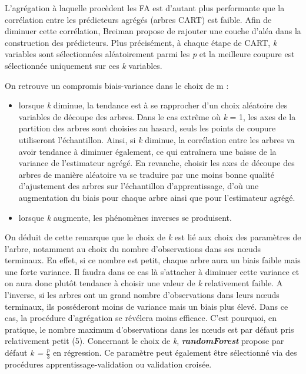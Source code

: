 	L'agrégation à laquelle procèdent les FA est d’autant plus performante que la corrélation entre les prédicteurs agrégés  (arbres CART) est faible. Afin de diminuer cette corrélation, Breiman\cite{BREI01} propose de rajouter une couche d’aléa dans la construction des
		prédicteurs. Plus précisément, à chaque étape de CART, \textit{k} variables sont sélectionnées aléatoirement parmi les \textit{p} et la meilleure coupure est sélectionnée uniquement sur ces \textit{k} variables. \par
		On retrouve un compromis biais-variance dans le choix de m :
		\begin{itemize}
		\item lorsque \textit{k} diminue, la tendance est à se rapprocher d’un choix aléatoire des variables
		de découpe des arbres. Dans le cas extrême où \textit{k} = 1, les axes de la partition des arbres
		sont choisies au hasard, seuls les points de coupure utiliseront l’échantillon. Ainsi, si \textit{k}
		diminue, la corrélation entre les arbres va avoir tendance à diminuer également, ce qui
		entraînera une baisse de la variance de l’estimateur agrégé. En revanche, choisir les axes
		de découpe des arbres de manière aléatoire va se traduire par une moins bonne
		qualité d’ajustement des arbres sur l’échantillon d’apprentissage, d’où une augmentation
		du biais pour chaque arbre ainsi que pour l’estimateur agrégé.
		\item lorsque \textit{k} augmente, les phénomènes inverses se produisent.
		\end{itemize}
		On déduit de cette remarque que le choix de \textit{k} est lié aux choix des paramètres de l’arbre,
		notamment au choix du nombre d’observations dans ses nœuds terminaux. En effet, si ce
		nombre est petit, chaque arbre aura un biais faible mais une forte variance. Il faudra dans ce cas là s’attacher à diminuer cette variance et on aura donc plutôt tendance à choisir une
		valeur de \textit{k} relativement faible. A l’inverse, si les arbres ont un grand nombre d’observations
		dans leurs nœuds terminaux, ils posséderont moins de variance mais un biais plus élevé. Dans
		ce cas, la procédure d’agrégation se révélera moins efficace. C’est pourquoi, en pratique, le
		nombre maximum d’observations dans les nœuds est par défaut pris relativement petit (5). Concernant le choix de \textit{k}, \textit{\textbf{randomForest}} propose par
		défaut \textit{k = $\frac{p}{3}$} en régression. Ce paramètre peut également
		être sélectionné via des procédures apprentissage-validation ou validation croisée.